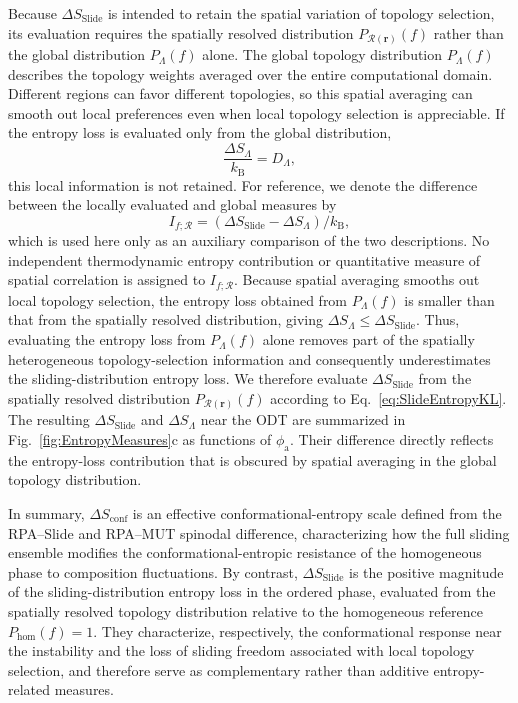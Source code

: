 \documentclass[journal=mamobx,manuscript=article]{achemso}
\begin{document}
Because $\Delta S_{\mathrm{Slide}}$ is intended to retain the spatial variation of topology selection, its evaluation requires the spatially resolved distribution $P_{\mathcal R(\bm r)}(f)$ rather than the global distribution $P_\Lambda(f)$ alone.
The global topology distribution $P_\Lambda(f)$ describes the topology weights averaged over the entire computational domain.
Different regions can favor different topologies, so this spatial averaging can smooth out local preferences even when local topology selection is appreciable.
If the entropy loss is evaluated only from the global distribution,
\begin{equation}
    \frac{\Delta S_\Lambda}{k_{\mathrm B}}
    =
    D_\Lambda,
\end{equation}
this local information is not retained.
For reference, we denote the difference between the locally evaluated and global measures by
\begin{equation}
    I_{f;\mathcal R}
    =
    (\Delta S_{\mathrm{Slide}}-\Delta S_\Lambda)/k_{\mathrm B},
\end{equation}
which is used here only as an auxiliary comparison of the two descriptions.
No independent thermodynamic entropy contribution or quantitative measure of spatial correlation is assigned to $I_{f;\mathcal R}$.
Because spatial averaging smooths out local topology selection, the entropy loss obtained from $P_\Lambda(f)$ is smaller than that from the spatially resolved distribution, giving $\Delta S_\Lambda\leq\Delta S_{\mathrm{Slide}}$.
Thus, evaluating the entropy loss from $P_\Lambda(f)$ alone removes part of the spatially heterogeneous topology-selection information and consequently underestimates the sliding-distribution entropy loss.
We therefore evaluate $\Delta S_{\mathrm{Slide}}$ from the spatially resolved distribution $P_{\mathcal R(\bm r)}(f)$ according to Eq.~\eqref{eq:SlideEntropyKL}.
The resulting $\Delta S_{\mathrm{Slide}}$ and $\Delta S_\Lambda$ near the ODT are summarized in Fig.~\ref{fig:EntropyMeasures}c as functions of $\phi_{\mathrm a}$.
Their difference directly reflects the entropy-loss contribution that is obscured by spatial averaging in the global topology distribution.



In summary, $\Delta S_{\mathrm{conf}}$ is an effective conformational-entropy scale defined from the RPA--Slide and RPA--MUT spinodal difference, characterizing how the full sliding ensemble modifies the conformational-entropic resistance of the homogeneous phase to composition fluctuations.
By contrast, $\Delta S_{\mathrm{Slide}}$ is the positive magnitude of the sliding-distribution entropy loss in the ordered phase, evaluated from the spatially resolved topology distribution relative to the homogeneous reference $P_{\mathrm{hom}}(f)=1$.
They characterize, respectively, the conformational response near the instability and the loss of sliding freedom associated with local topology selection, and therefore serve as complementary rather than additive entropy-related measures.
\end{document}
